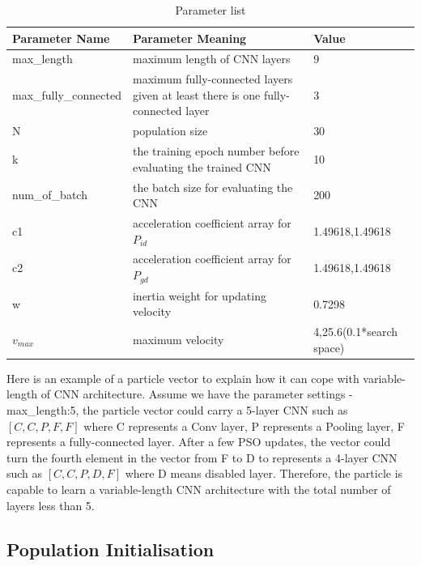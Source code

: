 \documentclass[conference]{IEEEtran}
\begin{document}
\begin{table}[!t]
	\renewcommand{\arraystretch}{1.3}
	\caption{Parameter list}
	\label{table:ParameterList}
	\centering
	\begin{tabular}{|p{2.5cm}|p{3cm}|p{2cm}|}
		\hline
		Parameter Name & Parameter Meaning & Value\\
		\hline
		max\_length & maximum length of CNN layers & 9\\
		\hline
		max\_fully\_connected & maximum fully-connected layers given at least there is one fully-connected layer & 3\\
		\hline
		N & population size & 30\\
		\hline
		k & the training epoch number before evaluating the trained CNN & 10\\
		\hline
		num\_of\_batch & the batch size for evaluating the CNN & 200\\
		\hline
		c1 & acceleration coefficient array for $P_{id}$ & 1.49618,1.49618\\
		\hline
		c2 & acceleration coefficient array for $P_{gd}$ & 1.49618,1.49618\\
		\hline
		w & inertia weight for updating velocity & 0.7298\\
		\hline
		$v_{max}$ & maximum velocity & 4,25.6(0.1*search space)\\
		\hline
	\end{tabular}
\end{table}

Here is an example of a particle vector to explain how it can cope with variable-length of CNN architecture. Assume we have the parameter settings - max\_length:5, the particle vector could carry a 5-layer CNN such as $[C, C, P, F, F]$ where C represents a Conv layer, P represents a Pooling layer, F represents a fully-connected layer. After a few PSO updates, the vector could turn the fourth element in the vector from F to D to represents a 4-layer CNN such as $[C, C, P, D, F]$ where D means disabled layer. Therefore, the particle is capable to learn a variable-length CNN architecture with the total number of layers less than 5. 

\subsection{Population Initialisation}
\end{document}
